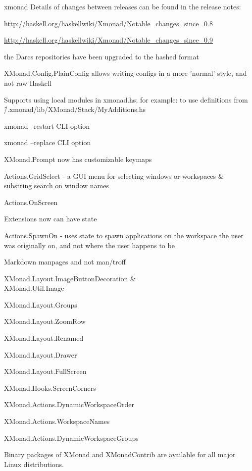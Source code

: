 \begin{hcarentry}{xmonad}
Details of changes between releases can be found in the release notes:
\begin{compactitem}
\item \url{http://haskell.org/haskellwiki/Xmonad/Notable_changes_since_0.8}
\item \url{http://haskell.org/haskellwiki/Xmonad/Notable_changes_since_0.9}
\item the Darcs repositories have been upgraded to the hashed format
\item XMonad.Config.PlainConfig allows writing configs in a more 'normal' style, and not raw Haskell
\item Supports using local modules in xmonad.hs; for example: to use definitions from \~/.xmonad/lib/XMonad/Stack/MyAdditions.hs
\item xmonad --restart CLI option
\item xmonad --replace CLI option
\item XMonad.Prompt now has customizable keymaps
\item Actions.GridSelect - a GUI menu for selecting windows or workspaces \& substring search on window names
\item Actions.OnScreen
\item Extensions now can have state
\item Actions.SpawnOn - uses state to spawn applications on the workspace the user was originally on,
  and not where the user happens to be
\item Markdown manpages and not man/troff
\item  XMonad.Layout.ImageButtonDecoration \&\\ XMonad.Util.Image
\item XMonad.Layout.Groups
\item XMonad.Layout.ZoomRow
\item XMonad.Layout.Renamed
\item XMonad.Layout.Drawer
\item XMonad.Layout.FullScreen
\item XMonad.Hooks.ScreenCorners
\item XMonad.Actions.DynamicWorkspaceOrder
\item XMonad.Actions.WorkspaceNames
\item XMonad.Actions.DynamicWorkspaceGroups
\end{compactitem}

Binary packages of XMonad and XMonadContrib are available for all major Linux distributions.


\end{hcarentry}
